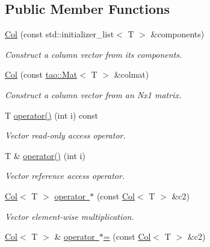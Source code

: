 \subsection*{Public Member Functions}
\begin{DoxyCompactItemize}
\item 
\mbox{\hyperlink{classtao_1_1_col_a9133bec2b352e2e139e51e1f9107473d}{Col}} (const std\+::initializer\+\_\+list$<$ T $>$ \&components)
\begin{DoxyCompactList}\small\item\em Construct a column vector from its components. \end{DoxyCompactList}\item 
\mbox{\label{classtao_1_1_col_af10fd1d477800a898d3c7eea90e5089c}} 
\mbox{\hyperlink{classtao_1_1_col_af10fd1d477800a898d3c7eea90e5089c}{Col}} (const \mbox{\hyperlink{classtao_1_1_mat}{tao\+::\+Mat}}$<$ T $>$ \&colmat)
\begin{DoxyCompactList}\small\item\em Construct a column vector from an Nx1 matrix. \end{DoxyCompactList}\item 
T \mbox{\hyperlink{classtao_1_1_col_a7d08ac2d077bed978eb783b5fe707a7c}{operator()}} (int i) const
\begin{DoxyCompactList}\small\item\em Vector read-\/only access operator. \end{DoxyCompactList}\item 
T \& \mbox{\hyperlink{classtao_1_1_col_ad7f3279e2764f5e1b0762e62517e738a}{operator()}} (int i)
\begin{DoxyCompactList}\small\item\em Vector reference access operator. \end{DoxyCompactList}\item 
\mbox{\hyperlink{classtao_1_1_col}{Col}}$<$ T $>$ \mbox{\hyperlink{classtao_1_1_col_a661dd9512fad58cfbedfdf52ca6806fb}{operator $\ast$}} (const \mbox{\hyperlink{classtao_1_1_col}{Col}}$<$ T $>$ \&c2)
\begin{DoxyCompactList}\small\item\em Vector element-\/wise multiplication. \end{DoxyCompactList}\item 
\mbox{\hyperlink{classtao_1_1_col}{Col}}$<$ T $>$ \& \mbox{\hyperlink{classtao_1_1_col_a9274e5a0efd840c97741d05dca7bd5a2}{operator $\ast$=}} (const \mbox{\hyperlink{classtao_1_1_col}{Col}}$<$ T $>$ \&c2)

\end{DoxyCompactItemize}
